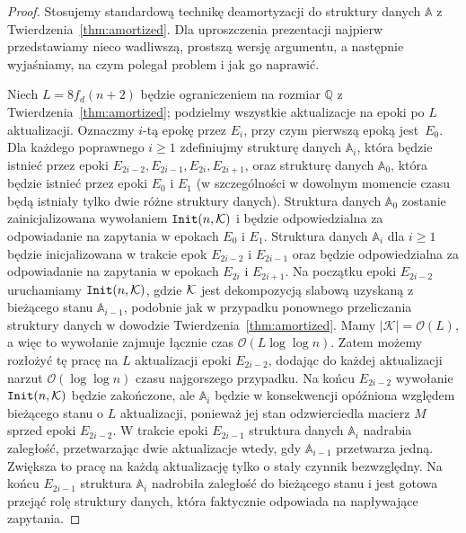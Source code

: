 \documentclass[runningheads]{llncs}
\newcommand{\Oh}{\mathcal{O}}
\renewcommand{\ge}{\geqslant}
\begin{document}
\begin{proof}
Stosujemy standardową technikę deamortyzacji do struktury danych
$\mathbb{A}$ z Twierdzenia~\ref{thm:amortized}. Dla uproszczenia prezentacji najpierw przedstawiamy nieco wadliwszą, prostszą wersję argumentu, a następnie wyjaśniamy, na czym polegał problem i jak go naprawić.

Niech $L=8 f_d(n+2)$ będzie ograniczeniem na rozmiar $\mathbb{Q}$ z Twierdzenia~\ref{thm:amortized}; podzielmy wszystkie aktualizacje na epoki po $L$ aktualizacji. Oznaczmy $i$-tą epokę przez $E_i$, przy czym pierwszą epoką jest~$E_0$. Dla każdego poprawnego $i \ge 1$ zdefiniujmy strukturę danych $\mathbb{A}_i$, która będzie istnieć przez epoki $E_{2i-2}, E_{2i-1}, E_{2i}, E_{2i+1}$, oraz strukturę danych $\mathbb{A}_0$, która będzie istnieć przez epoki $E_0$ i $E_1$ (w szczególności w dowolnym momencie czasu będą istniały tylko dwie różne struktury danych). Struktura danych $\mathbb{A}_0$ zostanie zainicjalizowana wywołaniem $\mathtt{Init}(n, \cal K)$ i będzie odpowiedzialna za odpowiadanie na zapytania w epokach $E_0$ i $E_1$. Struktura danych $\mathbb{A}_i$ dla $i \ge 1$ będzie inicjalizowana w trakcie epok $E_{2i-2}$ i $E_{2i-1}$ oraz będzie odpowiedzialna za odpowiadanie na zapytania w epokach $E_{2i}$ i $E_{2i+1}$. Na początku epoki $E_{2i-2}$ uruchamiamy $\mathtt{Init}(n, \cal K)$, gdzie $\cal K$ jest dekompozycją slabową uzyskaną z bieżącego stanu $\mathbb{A}_{i-1}$, podobnie jak w przypadku ponownego przeliczania struktury danych w dowodzie Twierdzenia~\ref{thm:amortized}. Mamy $|\mathcal{K}| = \Oh(L)$, a więc to wywołanie zajmuje łącznie czas $\Oh(L \log \log n)$. Zatem możemy rozłożyć tę pracę na $L$ aktualizacji epoki $E_{2i-2}$, dodając do każdej aktualizacji narzut $\Oh(\log \log n)$ czasu najgorszego przypadku. Na końcu $E_{2i-2}$ wywołanie $\mathtt{Init}(n, \cal K)$ będzie zakończone, ale $\mathbb{A}_i$ będzie w konsekwencji opóźniona względem bieżącego stanu o $L$ aktualizacji, ponieważ jej stan odzwierciedla macierz $M$ sprzed epoki $E_{2i-2}$. W trakcie epoki $E_{2i-1}$ struktura danych $\mathbb{A}_i$ nadrabia zaległość, przetwarzając dwie aktualizacje wtedy, gdy $\mathbb{A}_{i-1}$ przetwarza jedną. Zwiększa to pracę na każdą aktualizację tylko o stały czynnik bezwzględny. Na końcu $E_{2i-1}$ struktura $\mathbb{A}_i$ nadrobiła zaległość do bieżącego stanu i jest gotowa przejąć rolę struktury danych, która faktycznie odpowiada na napływające zapytania.


\end{proof}
\end{document}
